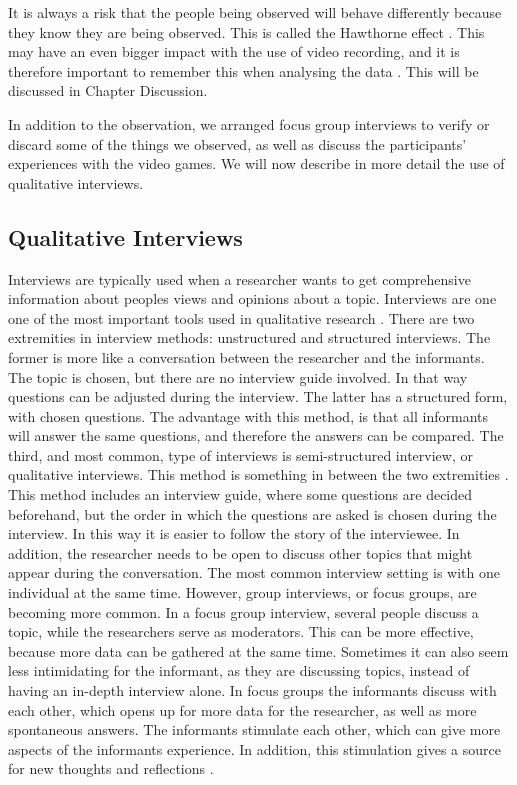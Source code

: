 It is always a risk that the people being observed will behave differently because they know they are being observed. This is called the Hawthorne effect \cite{interview}. This may have an even bigger impact with the use of video recording, and it is therefore important to remember this when analysing the data \cite{tjora}. This will be discussed in Chapter Discussion. 

In addition to the observation, we arranged focus group interviews to verify or discard some of the things we observed, as well as discuss the participants' experiences with the video games. We will now describe in more detail the use of qualitative interviews.  

\subsection{Qualitative Interviews}
Interviews are typically used when a researcher wants to get comprehensive information about peoples views and opinions about a topic. Interviews are one one of the most important tools used in qualitative research \cite{interview}. There are two extremities in interview methods: unstructured and structured interviews. The former is more like a conversation between the researcher and the informants. The topic is chosen, but there are no interview guide involved. In that way questions can be adjusted during the interview. The latter has a structured form, with chosen questions. The advantage with this method, is that all informants will answer the same questions, and therefore the answers can be compared. The third, and most common, type of interviews is semi-structured interview, or qualitative interviews. This method is something in between the two extremities \cite{qualitative}. This method includes an interview guide, where some questions are decided beforehand, but the order in which the questions are asked is chosen during the interview. In this way it is easier to follow the story of the interviewee. In addition, the researcher needs to be open to discuss other topics that might appear during the conversation. The most common interview setting is with one individual at the same time. However, group interviews, or focus groups, are becoming more common. In a focus group interview, several people discuss a topic, while the researchers serve as moderators. This can be more effective, because more data can be gathered at the same time. Sometimes it can also seem less intimidating for the informant, as they are discussing topics, instead of having an in-depth interview alone. In focus groups the informants discuss with each other, which opens up for more data for the researcher, as well as more spontaneous answers. The informants stimulate each other, which can give more aspects of the informants experience. In addition, this stimulation gives a source for new thoughts and reflections \cite{tjora}. 

